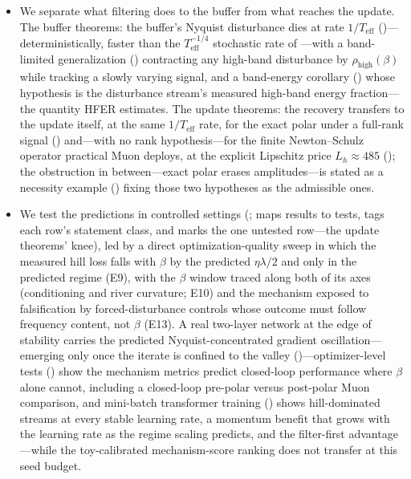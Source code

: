 \documentclass[11pt,a4paper]{article}
\theoremstyle{remark}
\newcommand{\Teff}{T_{\mathrm{eff}}}
\newcommand{\rhohigh}{\rho_{\mathrm{high}}}
\begin{document}
\begin{itemize}
A curved-valley reduction () carries the closed loop to bending rivers in three labeled strengths: an exact one-step identity; an exact solution for the linear floor, which decouples into \emph{two} straight-valley loops at the Hessian eigenvalues and exposes the frozen-coefficient formulas as its $\mu\to0$ limit; and a quasi-static reduction for general floors at the local sharpness $\lambda(1+f'^2)$ with a geometric passband forcing, whose stated validity margin is the filter memory against the bend.
The frozen stability diagnostic matches E10's measured confinement floors to grid resolution, and the $\beta$-free tracking offset is the geometric cost curvature exacts at every momentum.
\item We separate what filtering does to the buffer from what reaches the update.
The buffer theorems: the buffer's Nyquist disturbance dies at rate $1/\Teff$ ()---deterministically, faster than the $\Teff^{-1/4}$ stochastic rate of \citet{li2026denoise}---with a band-limited generalization () contracting any high-band disturbance by $\rhohigh(\beta)$ while tracking a slowly varying signal, and a band-energy corollary () whose hypothesis is the disturbance stream's measured high-band energy fraction---the quantity HFER estimates.
The update theorems: the recovery transfers to the update itself, at the same $1/\Teff$ rate, for the exact polar under a full-rank signal () and---with no rank hypothesis---for the finite Newton--Schulz operator practical Muon deploys, at the explicit Lipschitz price $L_h\approx485$ (); the obstruction in between---exact polar erases amplitudes---is stated as a necessity example () fixing those two hypotheses as the admissible ones.
\item We test the predictions in controlled settings (;  maps results to tests, tags each row's statement class, and marks the one untested row---the update theorems' knee), led by a direct optimization-quality sweep in which the measured hill loss falls with $\beta$ by the predicted $\eta\lambda/2$ and only in the predicted regime (E9), with the $\beta$ window traced along both of its axes (conditioning and river curvature; E10) and the mechanism exposed to falsification by forced-disturbance controls whose outcome must follow frequency content, not $\beta$ (E13).
A real two-layer network at the edge of stability \citep{cohen2021edge} carries the predicted Nyquist-concentrated gradient oscillation---emerging only once the iterate is confined to the valley ()---optimizer-level tests () show the mechanism metrics predict closed-loop performance where $\beta$ alone cannot, including a closed-loop pre-polar versus post-polar Muon comparison, and mini-batch transformer training () shows hill-dominated streams at every stable learning rate, a momentum benefit that grows with the learning rate as the regime scaling predicts, and the filter-first advantage---while the toy-calibrated mechanism-score ranking does not transfer at this seed budget.

\end{itemize}
\end{document}
